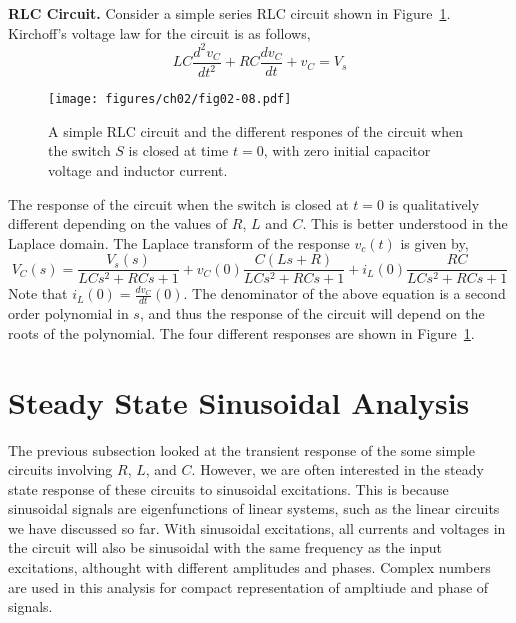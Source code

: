 \noindent\textbf{RLC Circuit.} Consider a simple series RLC circuit shown in Figure~\ref{fig:02-08}. Kirchoff's voltage law for the circuit is as follows,
\begin{equation}
    LC\frac{d^2 v_C}{dt^2} + RC \frac{d v_C}{dt} + v_C = V_s 
    \label{eq:02-32}
\end{equation}
\begin{figure}[t]
    \centering
    \texttt{[image: figures/ch02/fig02-08.pdf]}
    \caption{A simple RLC circuit and the different respones of the circuit when the switch $S$ is closed at time $t = 0$, with  zero initial capacitor voltage and inductor current.}
    \label{fig:02-08}
\end{figure}
The response of the circuit when the switch is closed at $t=0$ is qualitatively different depending on the values of $R$, $L$ and $C$. This is better understood in the Laplace domain. The Laplace transform of the response $v_c(t)$ is given by,
\begin{equation}
    V_C(s) = \frac{V_s(s)}{LCs^2 + RCs + 1} + v_C(0)\frac{C\left(Ls + R\right)}{LCs^2 + RCs + 1} + i_L(0)\frac{RC}{LCs^2 + RCs + 1}
    \label{eq:02-33}
\end{equation}
Note that $i_L(0) = \frac{d v_C}{dt}(0)$. The denominator of the above equation is a second order polynomial in $s$, and thus the response of the circuit will depend on the roots of the polynomial. The four different responses are shown in Figure~\ref{fig:02-08}.

\section{Steady State Sinusoidal Analysis}
The previous subsection looked at the transient response of the some simple circuits involving $R$, $L$, and $C$. However, we are often interested in the steady state response of these circuits to sinusoidal excitations. This is because sinusoidal signals are eigenfunctions of linear systems, such as the linear circuits we have discussed so far. With sinusoidal excitations, all currents and voltages in the circuit will also be sinusoidal with the same frequency as the input excitations, althought with different amplitudes and phases. Complex numbers are used in this analysis for compact representation of ampltiude and phase of signals. 

